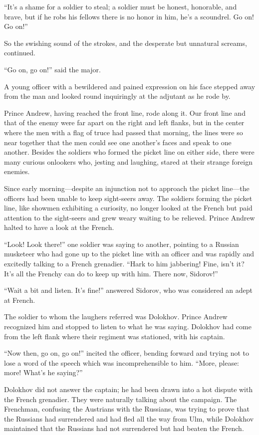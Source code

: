 ``It's a shame for a soldier to steal; a soldier must be honest,
honorable, and brave, but if he robs his fellows there is no
honor in him, he's a scoundrel. Go on! Go on!''

So the swishing sound of the strokes, and the desperate but
unnatural screams, continued.

``Go on, go on!'' said the major.

A young officer with a bewildered and pained expression on his
face stepped away from the man and looked round inquiringly at
the adjutant as he rode by.

Prince Andrew, having reached the front line, rode along it. Our
front line and that of the enemy were far apart on the right and
left flanks, but in the center where the men with a flag of truce
had passed that morning, the lines were so near together that the
men could see one another's faces and speak to one
another. Besides the soldiers who formed the picket line on
either side, there were many curious onlookers who, jesting and
laughing, stared at their strange foreign enemies.

Since early morning---despite an injunction not to approach the
picket line---the officers had been unable to keep sight-seers
away. The soldiers forming the picket line, like showmen
exhibiting a curiosity, no longer looked at the French but paid
attention to the sight-seers and grew weary waiting to be
relieved. Prince Andrew halted to have a look at the French.

``Look! Look there!'' one soldier was saying to another, pointing
to a Russian musketeer who had gone up to the picket line with an
officer and was rapidly and excitedly talking to a French
grenadier. ``Hark to him jabbering! Fine, isn't it? It's all the
Frenchy can do to keep up with him. There now, Sidorov!''

``Wait a bit and listen. It's fine!'' answered Sidorov, who was
considered an adept at French.

The soldier to whom the laughers referred was Dolokhov. Prince
Andrew recognized him and stopped to listen to what he was
saying. Dolokhov had come from the left flank where their
regiment was stationed, with his captain.

``Now then, go on, go on!'' incited the officer, bending forward
and trying not to lose a word of the speech which was
incomprehensible to him. ``More, please: more! What's he
saying?''

Dolokhov did not answer the captain; he had been drawn into a hot
dispute with the French grenadier. They were naturally talking
about the campaign. The Frenchman, confusing the Austrians with
the Russians, was trying to prove that the Russians had
surrendered and had fled all the way from Ulm, while Dolokhov
maintained that the Russians had not surrendered but had beaten
the French.

